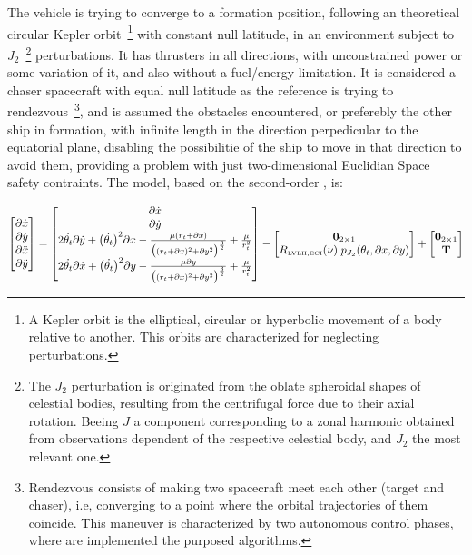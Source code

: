The vehicle is trying to converge to a formation position, following an theoretical circular Kepler orbit~\footnote{A Kepler orbit  is the elliptical, circular or hyperbolic movement of a body relative to another. This orbits are characterized for neglecting perturbations.} with constant null latitude, in an environment subject to \(J_2\)~\footnote{ The \(J_2\) perturbation \cite{curtis2019orbital} is originated from  the oblate spheroidal shapes of celestial bodies, resulting from the centrifugal force due to their axial rotation. Beeing \(J\) a component corresponding to a zonal harmonic obtained from observations dependent of the respective celestial body, and \(J_2\) the most relevant one. } perturbations. It has thrusters in all directions, with unconstrained power or some variation of it, and also without a fuel/energy limitation. It is considered a chaser spacecraft with equal null latitude as the reference \txtref is trying to rendezvous~\footnote{ Rendezvous \cite{luo2014survey} consists of making two spacecraft meet each other (target and chaser), i.e, converging to a point where the orbital trajectories of them coincide. This maneuver is characterized by two autonomous control phases, where are implemented the purposed algorithms.}, and is assumed the obstacles encountered, or preferebly the other ship in formation, with infinite length in the direction perpedicular to the equatorial plane, disabling the possibilitie of the ship to move in that direction to avoid them, providing a problem with just two-dimensional Euclidian Space safety contraints.  The model, based on the second-order  \cite{sullivan2017comprehensive}, is:

\begin{equation}
  \begin{bmatrix} \partial \dot{x} \\ \partial \dot{y} \\  \partial\ddot{ x } \\ \partial\ddot{ y} \end{bmatrix} = \begin{bmatrix}
  \partial\dot{ x } \\ \partial\dot{ y } \\ 2\dot{\theta_t}\partial\dot{y} + \bigl(\dot{\theta_t}\bigr)^2 \partial x - \frac{\mu(r_t + \partial x)}{\bigl((r_t + \partial x)^2 + \partial y^2\bigr)^{\frac{3}{2}}} + \frac{\mu}{r_t^2}  \\ 2\dot{\theta_t}\partial\dot{x} + \bigl(\dot{\theta_t}\bigr)^2 \partial y - \frac{\mu \partial y}{\bigl((r_t + \partial x)^2 + \partial y^2\bigr)^{\frac{3}{2}}} + \frac{\mu}{r_t^2} 
  \end{bmatrix} - \begin{bmatrix}
  \mathbf{0}_{2 \times 1} \\  R_{\text{\tiny LVLH,ECI}}(\nu)^.p_{J_2}(\theta_t, \partial x, \partial y)
  \end{bmatrix} + \begin{bmatrix}
  \mathbf{0}_{2 \times 1} \\ \mathbf{T}
  \end{bmatrix}
  \label{eq:orbital_dynamics}
\end{equation}

